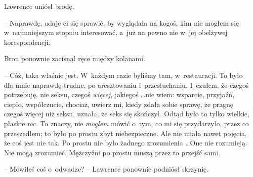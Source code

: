 \documentclass[oneside,polish,11pt,rmheadings]{mwbk}
\begin{document}
Lawrence uniósł brodę. 

-- Naprawdę, udaje ci się sprawić, by wyglądała na kogoś, kim nie mogłem się w~najmniejszym stopniu interesować, a~już na pewno nie w~jej obelżywej korespondencji. 

Bron ponownie zacisnął ręce między kolanami. 

-- Cóż, taka właśnie jest. W~każdym razie byliśmy tam, w~restauracji. To było dla mnie naprawdę trudne, po aresztowaniu i~przesłuchaniu. I~czułem, że czegoś potrzebuję, nie seksu, czegoś \textit{więcej}, jakiegoś \ldots  nie wiem: wsparcie, przyjaźń, ciepło, współczucie, chociaż, uwierz mi, kiedy zdała sobie sprawę, że pragnę czegoś więcej niż seksu, uznała, że seks się skończył. Odtąd było to tylko wielkie, płaskie nic. To znaczy, nie \textit{mogłem }mówić o~tym, co mi się przydarzyło, przez co przeszedłem; to było po prostu zbyt niebezpieczne. Ale nie miała nawet pojęcia, że coś jest nie tak. Po prostu nie było żadnego zrozumienia \ldots  One nie rozumieją. Nie mogą zrozumieć. Mężczyźni po prostu muszą przez to przejść sami. 

-- Mówiłeś coś o~odwadze? -- Lawrence ponownie podniósł skrzynię. 
\end{document}
